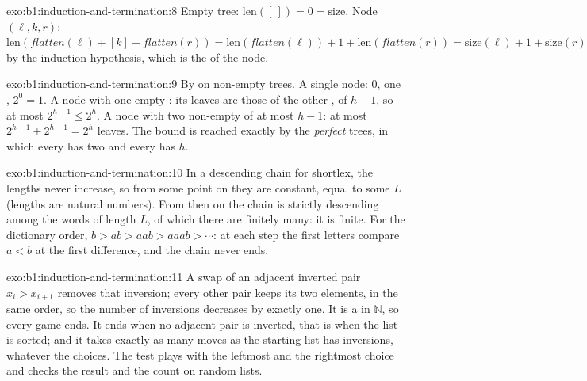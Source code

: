 \begin{solution}{exo:b1:induction-and-termination:8}
Empty tree: $\text{len}([\,]) = 0 = \text{size}$. Node $(\ell, k, r)$: $\text{len}(\mathit{flatten}(\ell) + [k] +
\mathit{flatten}(r)) = \text{len}(\mathit{flatten}(\ell)) + 1 + \text{len}(\mathit{flatten}(r)) = \text{size}(\ell) + 1 +
\text{size}(r)$ by the induction hypothesis, which is the  of the node.
\end{solution}

\begin{solution}{exo:b1:induction-and-termination:9}
By  on non-empty trees. A single node:  0, one , $2^0 = 1$. A node with one empty
: its leaves are those of the other , of  $h - 1$, so at most $2^{h - 1} \leq 2^h$. A node with two
non-empty  of  at most $h - 1$: at most $2^{h - 1} + 2^{h - 1} = 2^h$ leaves. The bound is reached exactly
by the \emph{perfect} trees, in which every  has two  and every  has  $h$.
\end{solution}

\begin{solution}{exo:b1:induction-and-termination:10}
In a descending chain for shortlex, the lengths never increase, so from some point on they are constant, equal to some
$L$ (lengths are natural numbers). From then on the chain is strictly descending among the words of length $L$, of
which there are finitely many: it is finite. For the dictionary order, $b > ab > aab > aaab > \cdots$: at each step
the first letters compare $a < b$ at the first difference, and the chain never ends.
\end{solution}

\begin{solution}{exo:b1:induction-and-termination:11}
A swap of an adjacent inverted pair $x_i > x_{i+1}$ removes that inversion; every other pair keeps its two elements, in
the same order, so the number of inversions decreases by exactly one. It is a  in $\mathbb{N}$, so every game
ends. It ends when no adjacent pair is inverted, that is when the list is sorted; and it takes exactly as many moves as
the starting list has inversions, whatever the choices. The test plays with the leftmost and the rightmost choice and
checks the result and the count on random lists.
\end{solution}

